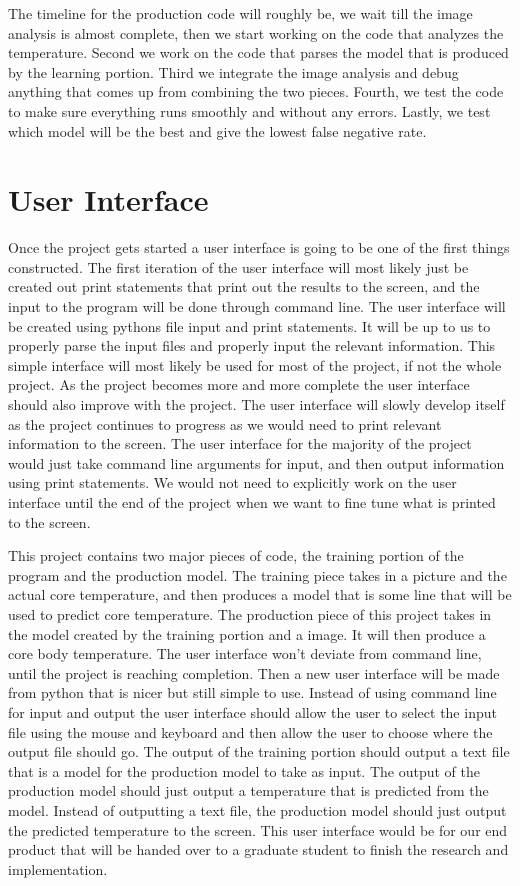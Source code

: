 \documentclass[10pt, draftclsnofoot, onecolumn]{IEEEtran}
\begin{document}
The timeline for the production code will roughly be, we wait till the image analysis is almost complete, then we start working on the code that analyzes the temperature. Second we work on the code that parses the model that is produced by the learning portion. Third we integrate the image analysis and debug anything that comes up from combining the two pieces. Fourth, we test the code to make sure everything runs smoothly and without any errors. Lastly, we test which model will be the best and give the lowest false negative rate.

\section{User Interface}
Once the project gets started a user interface is going to be one of the first things constructed. The first iteration of the user interface will most likely just be created out print statements that print out the results to the screen, and the input to the program will be done through command line. The user interface will be created using pythons file input and print statements. It will be up to us to properly parse the input files and properly input the relevant information. This simple interface will most likely be used for most of the project, if not the whole project. As the project becomes more and more complete the user interface should also improve with the project. The user interface will slowly develop itself as the project continues to progress as we would need to print relevant information to the screen. The user interface for the majority of the project would just take command line arguments for input, and then output information using print statements. We would not need to explicitly work on the user interface until the end of the project when we want to fine tune what is printed to the screen.

This project contains two major pieces of code, the training portion of the program and the production model. The training piece takes in a picture and the actual core temperature, and then produces a model that is some line that will be used to predict core temperature. The production piece of this project takes in the model created by the training portion and a image. It will then produce a core body temperature. The user interface won’t deviate from command line, until the project is reaching completion. Then a new user interface will be made from python that is nicer but still simple to use. Instead of using command line for input and output the user interface should allow the user to select the input file using the mouse and keyboard and then allow the user to choose where the output file should go. The output of the training portion should output a text file that is a model for the production model to take as input. The output of the production model should just output a temperature that is predicted from the model. Instead of outputting a text file, the production model should just output the predicted temperature to the screen. This user interface would be for our end product that will be handed over to a graduate student to finish the research and implementation.
\end{document}
